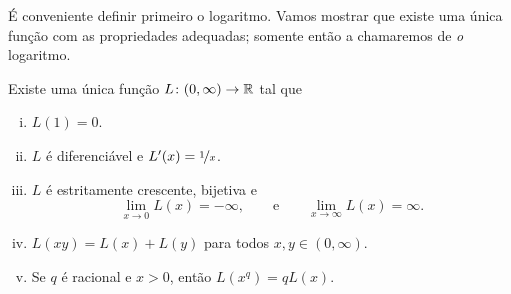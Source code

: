É conveniente definir primeiro o logaritmo.
Vamos mostrar que existe uma única função com as propriedades adequadas;
somente então a chamaremos de \emph{o} logaritmo.

\begin{prop}
Existe uma única função $L \colon (0,\infty) \to {\mathbb{R}}$ tal que
\begin{enumerate}[(i)]
\item \label{it:log:i}
$L(1) = 0$.
\item \label{it:log:ii}
$L$ é diferenciável e $L'(x) = \nicefrac{1}{x}$.
\item \label{it:log:iii}
$L$ é estritamente crescente, bijetiva e
\begin{equation*}
\lim_{x\to 0} L(x) = -\infty , \qquad \text{e} \qquad
\lim_{x\to \infty} L(x) = \infty .
\end{equation*}
\item \label{it:log:iv}
$L(xy) = L(x)+L(y)$ para todos $x,y \in (0,\infty)$.
\item \label{it:log:v}
Se $q$ é racional e $x > 0$, então
$L(x^q) = q L(x)$.
\end{enumerate}
\end{prop}

